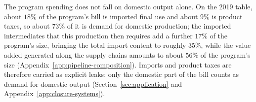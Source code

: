 The program spending does not fall on domestic output alone. On the 2019 table, about $18\%$ of the program's bill is imported final use and about $9\%$ is product taxes, so about $73\%$ of it is demand for domestic production; the imported intermediates that this production then requires add a further $17\%$ of the program's size, bringing the total import content to roughly $35\%$, while the value added generated along the supply chains amounts to about $56\%$ of the program's size (Appendix~\ref{app:pipeline-composition}). Imports and product taxes are therefore carried as explicit leaks: only the domestic part of the bill counts as demand for domestic output (Section~\ref{sec:application} and Appendix~\ref{app:closure-systems}).
%




